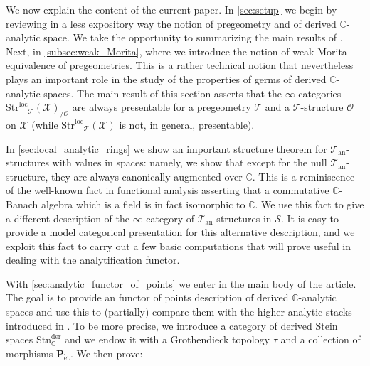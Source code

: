 \documentclass[12pt,a4paper,reqno]{amsart}
\theoremstyle{plain}
\theoremstyle{definition}
\theoremstyle{remark}
\numberwithin{equation}{section}
\begin{document}
We now explain the content of the current paper.
In \cref{sec:setup} we begin by reviewing in a less expository way the notion of pregeometry and of derived {$\mathbb C$-analytic\xspace} space.
We take the opportunity to summarizing the main results of \cite{DAG-IX}.
Next, in \cref{subsec:weak_Morita}, where we introduce the notion of weak Morita equivalence of pregeometries. This is a rather technical notion that nevertheless plays an important role in the study of the properties of germs of derived {$\mathbb C$-analytic\xspace} spaces. The main result of this section asserts that the $\infty$-categories ${\mathrm{Str}^\mathrm{loc}}_{\mathcal T}({\mathcal X})_{/{\mathcal O}}$ are always presentable for a pregeometry ${\mathcal T}$ and a ${\mathcal T}$-structure ${\mathcal O}$ on ${\mathcal X}$ (while ${\mathrm{Str}^\mathrm{loc}}_{\mathcal T}({\mathcal X})$ is not, in general, presentable).

In \cref{sec:local_analytic_rings} we show an important structure theorem for ${{\mathcal T}_{\mathrm{an}}}$-structures with values in spaces: namely, we show that except for the null ${{\mathcal T}_{\mathrm{an}}}$-structure, they are always canonically augmented over $\mathbb C$. This is a reminiscence of the well-known fact in functional analysis asserting that a commutative $\mathbb C$-Banach algebra which is a field is in fact isomorphic to $\mathbb C$. We use this fact to give a different description of the $\infty$-category of ${{\mathcal T}_{\mathrm{an}}}$-structures in ${\mathcal S}$. It is easy to provide a model categorical presentation for this alternative description, and we exploit this fact to carry out a few basic computations that will prove useful in dealing with the analytification functor.

With \cref{sec:analytic_functor_of_points} we enter in the main body of the article. The goal is to provide an functor of points description of derived {$\mathbb C$-analytic\xspace} spaces and use this to (partially) compare them with the higher analytic stacks introduced in \cite{Porta_Yu_Higher_analytic_stacks_2014}. To be more precise, we introduce a category of derived Stein spaces ${\mathrm{Stn}^{\mathrm{der}}_{\mathbb C}}$ and we endow it with a Grothendieck topology $\tau$ and a collection of morphisms ${\mathbf P}_{\mathrm{\acute{e}t}}$. We then prove:
\end{document}
